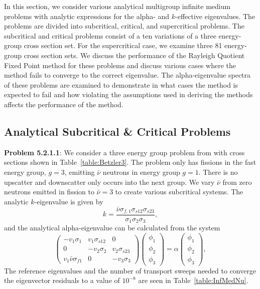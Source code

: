 In this section, we consider various analytical multigroup infinite medium problems with analytic expressions for the alpha- and $k$-effective eigenvalues. The problems are divided into subcritical, critical, and supercritical problems. The subcritical and critical problems consist of a ten variations of a three energy-group cross section set. For the supercritical case, we examine three 81 energy-group cross section sets. We discuss the performance of the Rayleigh Quotient Fixed Point method for these problems and discuss various cases where the method fails to converge to the correct eigenvalue. The alpha-eigenvalue spectra of these problems are examined to demonstrate in what cases the method is expected to fail and how violating the assumptions used in deriving the methods affects the performance of the method.

\subsection{Analytical Subcritical \& Critical Problems}

\textbf{Problem 5.2.1.1}: We consider a three energy group problem from \cite{Betzler2014Alpha} with cross sections shown in Table~\ref{table:Betzler3}. The problem only has fissions in the fast energy group, $g = 3$, emitting $\bar{\nu}$ neutrons in energy group $g = 1$. There is no upscatter and downscatter only occurs into the next group. We vary $\bar{\nu}$ from zero neutrons emitted in fission to $\bar{\nu} = 3$ to create various subcritical systems. The analytic $k$-eigenvalue is given by
\begin{equation}
	k = \frac{\bar{\nu} \sigma_{f,1} \sigma_{s12} \sigma_{s23}}{\sigma_{1} \sigma_{2} \sigma_{3}},
\end{equation}
and the analytical alpha-eigenvalue can be calculated from the system
\begin{equation}
	\begin{pmatrix}
		-v_{1} \sigma_{1} & v_{1} \sigma_{s12} & 0 \\
		0 & -v_{2} \sigma_{2} & v_{2} \sigma_{s23} \\
		v_{1} \bar{\nu} \sigma_{f1} & 0 & -v_{3} \sigma_{3}
	\end{pmatrix}
	\begin{pmatrix}
		\phi_{1} \\ \phi_{2} \\ \phi_{3}
	\end{pmatrix} = 
	\alpha
	\begin{pmatrix}
		\phi_{1} \\ \phi_{2} \\ \phi_{3}
	\end{pmatrix},
\end{equation}
The reference eigenvalues and the number of transport sweeps needed to converge the eigenvector residuals to a value of $10^{-8}$ are seen in Table~\ref{table:InfMedNu}. 

